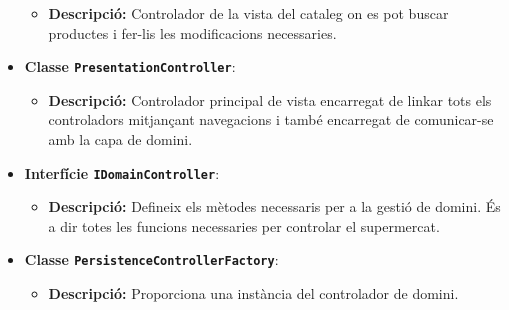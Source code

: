 \documentclass[a4paper,12pt]{report}
\begin{document}
\begin{itemize}
	\begin{itemize}
		\item \textbf{Descripció:} Controlador de la vista del cataleg on es pot buscar productes i fer-lis les modificacions necessaries.
	\end{itemize}
	\item \textbf{Classe \texttt{PresentationController}}:
	\begin{itemize}
		\item \textbf{Descripció:} Controlador principal de vista encarregat de linkar tots els controladors mitjançant navegacions i també encarregat de comunicar-se amb la capa de domini.
	\end{itemize}
	\item \textbf{Interfície \texttt{IDomainController}}:
	\begin{itemize}
		\item \textbf{Descripció:} Defineix els mètodes necessaris per a la gestió de domini. És a dir totes les funcions necessaries per controlar el supermercat.
	\end{itemize}
	\item \textbf{Classe \texttt{PersistenceControllerFactory}}:
	\begin{itemize}
		\item \textbf{Descripció:} Proporciona una instància del controlador de domini.
	\end{itemize}


\end{itemize}
\end{document}
